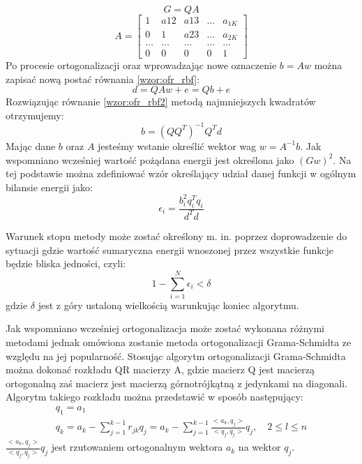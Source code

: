\begin{equation}G = QA\end{equation}
\begin{equation}
A = \begin{bmatrix}
1      & a{12}  & a{13}  & \hdots & a_{1K} \\
0      & 1      & a{23}  & \hdots & a_{2K} \\
\hdots & \hdots & \hdots & \hdots & \hdots \\
0      & 0      & 0      & 0      & 1     
\end{bmatrix}
\end{equation}
Po procesie ortogonalizacji oraz wprowadzając nowe oznaczenie $b = Aw$ można zapisać nową postać równania \ref{wzor:ofr_rbf}:
\begin{equation}
	\label{wzor:ofr_rbf2}
	d = QAw + e = Qb + e
\end{equation}
Rozwiązując równanie \ref{wzor:ofr_rbf2} metodą najmniejszych kwadratów otrzymujemy:
\begin{equation}
	b = (QQ^T)^{-1}Q^Td
\end{equation}
Mając dane $b$ oraz $A$ jesteśmy wstanie określić wektor wag $w = A^{-1}b$.
Jak wspomniano wcześniej wartość pożądana energii jest określona jako $(Gw)^2$. Na tej podstawie można zdefiniować wzór określający udział danej funkcji w ogólnym bilansie energii jako:
\begin{equation}
	\epsilon_i = \frac{b_i^2q_i^Tq_i}{d^Td}
\end{equation}

Warunek stopu metody może zostać określony m. in. poprzez doprowadzenie do sytuacji gdzie wartość sumaryczna energii wnoszonej przez wszystkie funkcje będzie bliska jedności, czyli:
\begin{equation}
	1 - \sum_{i=1}^N \epsilon_i < \delta
\end{equation}
gdzie $\delta$ jest z góry ustaloną wielkością warunkując koniec algorytmu.

Jak wspomniano wcześniej ortogonalizacja może zostać wykonana różnymi metodami jednak omówiona zostanie metoda ortogonalizacji Grama-Schmidta ze względu na jej popularność. Stosując algorytm ortogonalizacji Grama-Schmidta można dokonać rozkładu QR macierzy A, gdzie macierz Q jest macierzą ortogonalną zaś macierz jest macierzą górnotrójkątną z jedynkami na diagonali. Algorytm takiego rozkładu można przedstawić w sposób następujący\cite{Bernardelli}:
\begin{equation}
	\begin{array}{l}
	q_1 = a_1 \\
	q_k = a_k - \sum_{j=1}^{k-1} r_{jk}q_j = a_k - \sum_{j=1}^{k-1} \frac{<a_k,q_j>}{<q_j,q_j>} q_j, \quad 2 \leq l  \leq n 
\end{array}
\end{equation}
$\frac{<a_k,q_j>}{<q_j,q_j>} q_j$ jest rzutowaniem ortogonalnym wektora $a_k$ na wektor $q_j$.

